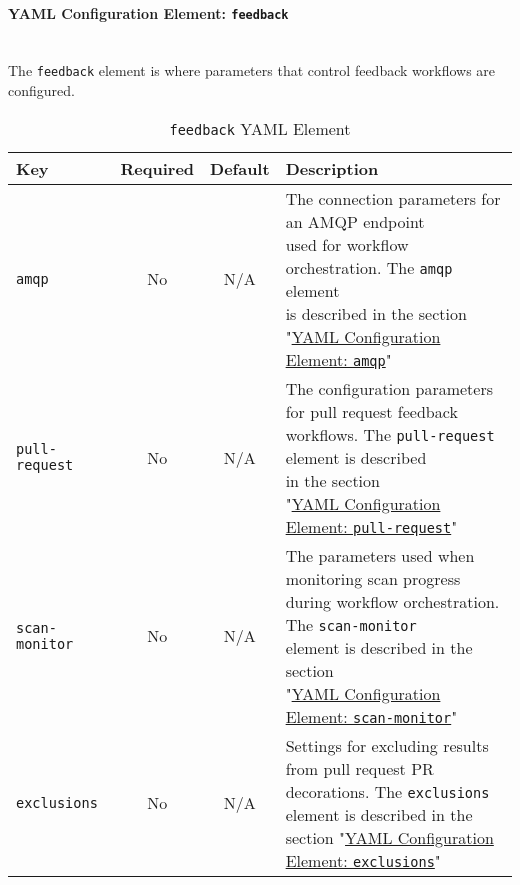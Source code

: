 \paragraph{YAML Configuration Element: \texttt{feedback} }\label{sec:feedback-element}

\noindent\\The \texttt{feedback} element is where parameters that control feedback
workflows are configured.

\begin{table}[ht]
    \caption{\texttt{feedback} YAML Element}  
    \label{tab:feedback-section-keys}      
    \begin{tabularx}{\textwidth}{lccl}
        \toprule
        \textbf{Key} & \textbf{Required} & \textbf{Default} & \textbf{Description}\\
        \midrule
        \texttt{amqp} & No & N/A & \makecell[l]{The connection parameters for an AMQP endpoint
        \\used for workflow orchestration. The \texttt{amqp} element
        \\is described in the section
        \\"\hyperref[sec:amqp-element]{YAML Configuration Element: \texttt{amqp}}"}\\
        \midrule
        \texttt{pull-request} & No & N/A & \makecell[l]{The configuration parameters for
        pull request feedback\\workflows. The \texttt{pull-request} element is described
        \\in the section
        \\"\hyperref[sec:pull-request-element]{YAML Configuration Element: \texttt{pull-request}}"}\\
        \midrule
        \texttt{scan-monitor} & No & N/A & \makecell[l]{The parameters used when monitoring scan
        progress\\during workflow orchestration. The \texttt{scan-monitor}\\element
        is described in the section
        \\"\hyperref[sec:scan-monitor-element]{YAML Configuration Element: \texttt{scan-monitor}}"}\\
        \midrule
        \texttt{exclusions} & No & N/A & \makecell[l]{Settings for excluding results from pull request PR\\
        decorations.  The \texttt{exclusions} element is described in the\\
        section "\hyperref[sec:exclusions-element]{YAML Configuration Element: \texttt{exclusions}}"}\\
        \bottomrule
    \end{tabularx}
\end{table}



